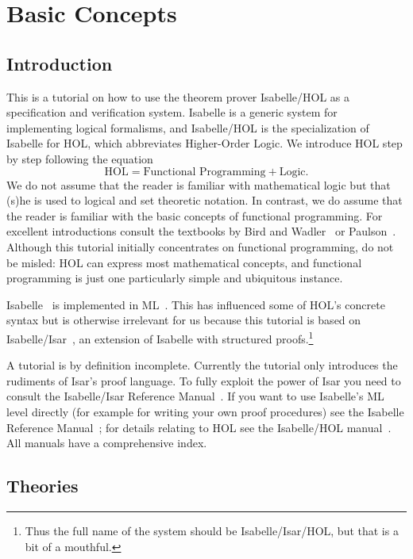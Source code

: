 \chapter{Basic Concepts}

\section{Introduction}

This is a tutorial on how to use the theorem prover Isabelle/HOL as a specification and
verification system. Isabelle is a generic system for implementing logical
formalisms, and Isabelle/HOL is the specialization of Isabelle for
HOL, which abbreviates Higher-Order Logic. We introduce HOL step by step
following the equation
\[ \mbox{HOL} = \mbox{Functional Programming} + \mbox{Logic}. \]
We do not assume that the reader is familiar with mathematical logic but that
(s)he is used to logical and set theoretic notation.  In contrast, we do assume
that the reader is familiar with the basic concepts of functional programming.
For excellent introductions consult the textbooks by Bird and
Wadler~\cite{Bird-Wadler} or Paulson~\cite{paulson-ml2}.  Although this
tutorial initially concentrates on functional programming, do not be
misled: HOL can express most mathematical concepts, and functional programming
is just one particularly simple and ubiquitous instance.

Isabelle~\cite{paulson-isa-book} is implemented in ML~\cite{SML}.
This has influenced some of HOL's concrete syntax but is otherwise
irrelevant for us because this tutorial is based on
Isabelle/Isar~\cite{isabelle-isar-ref}, an extension of Isabelle
with structured proofs.\footnote{Thus the full name of the system should be
  Isabelle/Isar/HOL, but that is a bit of a mouthful.}

A tutorial is by definition incomplete.  Currently the tutorial only
introduces the rudiments of Isar's proof language. To fully exploit the power
of Isar you need to consult the Isabelle/Isar Reference
Manual~\cite{isabelle-isar-ref}. If you want to use Isabelle's ML level
directly (for example for writing your own proof procedures) see the Isabelle
Reference Manual~\cite{isabelle-ref}; for details relating to HOL see the
Isabelle/HOL manual~\cite{isabelle-HOL}. All manuals have a comprehensive
index.

\section{Theories}
\label{sec:Basic:Theories}

